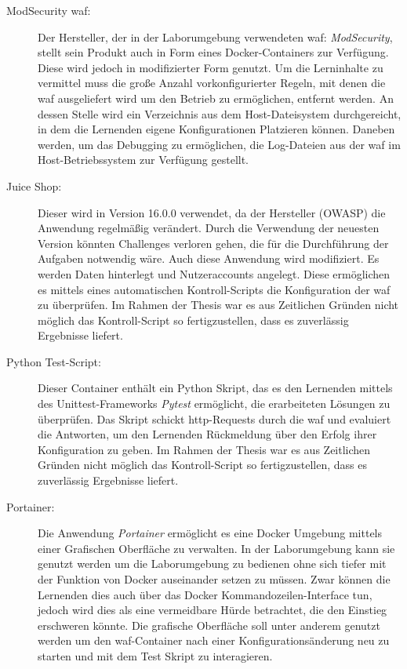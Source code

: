 \begin{description}
    \item[ModSecurity \ac{waf}:] Der Hersteller, der in der Laborumgebung verwendeten \ac{waf}: \textit{ModSecurity}, stellt sein Produkt auch in Form eines Docker-Containers zur Verfügung. 
    Diese wird jedoch in modifizierter Form genutzt.
    Um die Lerninhalte zu vermittel muss die große Anzahl vorkonfigurierter Regeln, mit denen die \ac{waf} ausgeliefert wird um den Betrieb zu ermöglichen, entfernt werden.
    An dessen Stelle wird ein Verzeichnis aus dem Host-Dateisystem durchgereicht, in dem die Lernenden eigene Konfigurationen Platzieren können.
    Daneben werden, um das Debugging zu ermöglichen, die Log-Dateien aus der \ac{waf} im Host-Betriebssystem zur Verfügung gestellt.
    
    \item[Juice Shop:] Dieser wird in Version 16.0.0 verwendet, da der Hersteller (OWASP) die Anwendung regelmäßig verändert.
    Durch die Verwendung der neuesten Version könnten Challenges verloren gehen, die für die Durchführung der Aufgaben notwendig wäre.
    Auch diese Anwendung wird modifiziert.
    Es werden Daten hinterlegt und Nutzeraccounts angelegt.
    Diese ermöglichen es mittels eines automatischen Kontroll-Scripts die Konfiguration der \ac{waf} zu überprüfen.
    Im Rahmen der Thesis war es aus Zeitlichen Gründen nicht möglich das Kontroll-Script so fertigzustellen, dass es zuverlässig Ergebnisse liefert.

    \item[Python Test-Script:] Dieser Container enthält ein Python Skript, das es den Lernenden mittels des Unittest-Frameworks \textit{Pytest} ermöglicht, die erarbeiteten Lösungen zu überprüfen.
    Das Skript schickt \ac{http}-Requests durch die \ac{waf} und evaluiert die Antworten, um den Lernenden Rückmeldung über den Erfolg ihrer Konfiguration zu geben.
    Im Rahmen der Thesis war es aus Zeitlichen Gründen nicht möglich das Kontroll-Script so fertigzustellen, dass es zuverlässig Ergebnisse liefert.

    \item[Portainer:] Die Anwendung \textit{Portainer} ermöglicht es eine Docker Umgebung mittels einer Grafischen Oberfläche zu verwalten.
    In der Laborumgebung kann sie genutzt werden um die Laborumgebung zu bedienen ohne sich tiefer mit der Funktion von Docker auseinander setzen zu müssen.
    Zwar können die Lernenden dies auch über das Docker Kommandozeilen-Interface tun, jedoch wird dies als eine vermeidbare Hürde betrachtet, die den Einstieg erschweren könnte.
    Die grafische Oberfläche soll unter anderem genutzt werden um den \ac{waf}-Container nach einer Konfigurationsänderung neu zu starten und mit dem Test Skript zu interagieren. 
\end{description}

